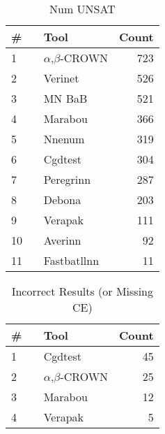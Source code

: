 
\begin{table}[h]
\begin{center}
\caption{Num UNSAT} \label{tab:stats3}
{\setlength{\tabcolsep}{2pt}
\begin{tabular}[h]{@{}llr@{}}
\toprule
\textbf{\# ~} & \textbf{Tool} & \textbf{Count}\\
\midrule
1 & $\alpha$,$\beta$-CROWN & 723 \\
2 & Verinet & 526 \\
3 & MN BaB & 521 \\
4 & Marabou & 366 \\
5 & Nnenum & 319 \\
6 & Cgdtest & 304 \\
7 & Peregrinn & 287 \\
8 & Debona & 203 \\
9 & Verapak & 111 \\
10 & Averinn & 92 \\
11 & Fastbatllnn & 11 \\
\bottomrule
\end{tabular}
}
\end{center}
\end{table}




\begin{table}[h]
\begin{center}
\caption{Incorrect Results (or Missing CE)} \label{tab:stats4}
{\setlength{\tabcolsep}{2pt}
\begin{tabular}[h]{@{}llr@{}}
\toprule
\textbf{\# ~} & \textbf{Tool} & \textbf{Count}\\
\midrule
1 & Cgdtest & 45 \\
2 & $\alpha$,$\beta$-CROWN & 25 \\
3 & Marabou & 12 \\
4 & Verapak & 5 \\
\bottomrule
\end{tabular}
}
\end{center}
\end{table}








